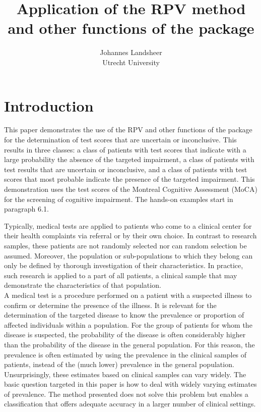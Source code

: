 \documentclass[
  nojss]{jss}
\author{
Johannes Landsheer\\Utrecht University
}
\title{Application of the RPV method and other functions of the
\pkg{UncertainInterval} package}
\begin{document}
\hypertarget{introduction}{%
\section{Introduction}\label{introduction}}

This paper demonstrates the use of the RPV and other functions of the
 package for the determination of test scores
that are uncertain or inconclusive. This results in three classes: a
class of patients with test scores that indicate with a large
probability the absence of the targeted impairment, a class of patients
with test results that are uncertain or inconclusive, and a class of
patients with test scores that most probable indicate the presence of
the targeted impairment. This demonstration uses the test scores of the
Montreal Cognitive Assessment (MoCA) for the screening of cognitive
impairment. The hands-on examples start in paragraph 6.1.

Typically, medical tests are applied to patients who come to a clinical
center for their health complaints via referral or by their own choice.
In contrast to research samples, these patients are not randomly
selected nor can random selection be assumed. Moreover, the population
or sub-populations to which they belong can only be defined by thorough
investigation of their characteristics. In practice, such research is
applied to a part of all patients, a clinical sample that may
demonstrate the characteristics of that population.\\
A medical test is a procedure performed on a patient with a suspected
illness to confirm or determine the presence of the illness. It is
relevant for the determination of the targeted disease to know the
prevalence or proportion of affected individuals within a population.
For the group of patients for whom the disease is suspected, the
probability of the disease is often considerably higher than the
probability of the disease in the general population. For this reason,
the prevalence is often estimated by using the prevalence in the
clinical samples of patients, instead of the (much lower) prevalence in
the general population. Unsurprisingly, these estimates based on
clinical samples can vary widely. The basic question targeted in this
paper is how to deal with widely varying estimates of prevalence. The
method presented does not solve this problem but enables a
classification that offers adequate accuracy in a larger number of
clinical settings.
\end{document}
